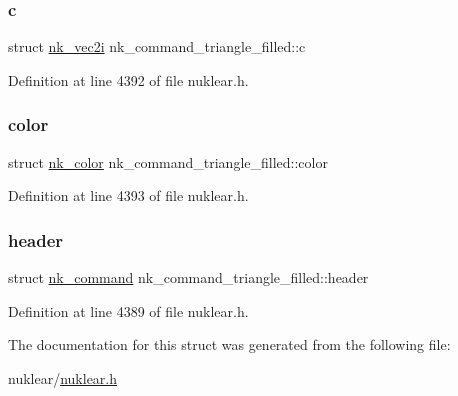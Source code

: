 \subsubsection{\texorpdfstring{c}{c}}
{\footnotesize\ttfamily struct \mbox{\hyperlink{structnk__vec2i}{nk\+\_\+vec2i}} nk\+\_\+command\+\_\+triangle\+\_\+filled\+::c}



Definition at line 4392 of file nuklear.\+h.

\mbox{\label{structnk__command__triangle__filled_af1a8f938d6b75eafc0212ab4c5a1baf8}} 
\subsubsection{\texorpdfstring{color}{color}}
{\footnotesize\ttfamily struct \mbox{\hyperlink{structnk__color}{nk\+\_\+color}} nk\+\_\+command\+\_\+triangle\+\_\+filled\+::color}



Definition at line 4393 of file nuklear.\+h.

\mbox{\label{structnk__command__triangle__filled_aba10245834e42312409e2b46e89364c5}} 
\subsubsection{\texorpdfstring{header}{header}}
{\footnotesize\ttfamily struct \mbox{\hyperlink{structnk__command}{nk\+\_\+command}} nk\+\_\+command\+\_\+triangle\+\_\+filled\+::header}



Definition at line 4389 of file nuklear.\+h.



The documentation for this struct was generated from the following file\+:\begin{DoxyCompactItemize}
\item 
nuklear/\mbox{\hyperlink{nuklear_8h}{nuklear.\+h}}\end{DoxyCompactItemize}
